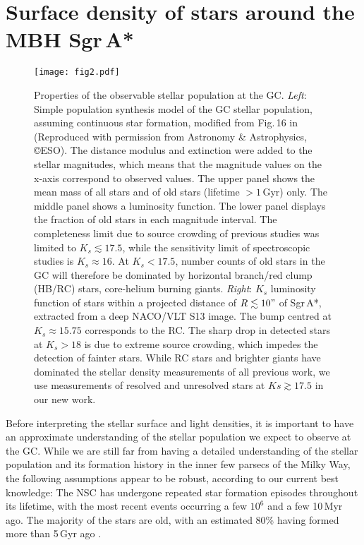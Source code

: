 \documentclass[a4paper]{jpconf}
\begin{document}
\section{Surface density of stars around the MBH Sgr\,A*}


\begin{figure}[htb]
\label{Fig:LF}
\texttt{[image: fig2.pdf]}
\caption{Properties of the observable stellar population at the
  GC. {\it Left}: Simple population synthesis model of the GC stellar
  population, assuming continuous star formation, modified from
  Fig.\,16 in \cite{Schodel:2007tw} (Reproduced with permission from
  Astronomy \& Astrophysics, \copyright ESO). The distance modulus and
  extinction were added to the stellar magnitudes, which means that
  the magnitude values on the x-axis correspond to observed
  values. The upper panel shows the mean mass of all stars and of old
  stars (lifetime $> 1$\,Gyr) only. The middle panel shows a
  luminosity function. The lower panel displays the fraction of old
  stars in each magnitude interval. The completeness limit due to
  source crowding of previous studies was limited to
  $K_{s}\lesssim17.5$, while the sensitivity limit of spectroscopic
  studies is $K_{s}\approx16$. At $K_{s}<17.5$, number counts of old
  stars in the GC will therefore be dominated by horizontal branch/red
  clump (HB/RC) stars, core-helium burning giants. {\it Right}:
  $K_{s}$ luminosity function of stars within a projected distance of
  $R\lesssim10"$ of Sgr\,A*, extracted from a deep NACO/VLT S13 image.
  The bump centred at $K_{s}\approx15.75$ corresponds to the RC. The
  sharp drop in detected stars at $K_{s}>18$ is due to extreme source
  crowding, which impedes the detection of fainter stars. While RC
  stars and brighter giants have dominated the stellar density
  measurements of all previous work, we use measurements of resolved
  and unresolved stars at $Ks\gtrsim17.5$ in our new work.}
\end{figure}
 
Before interpreting the stellar surface and light densities, it is
important to have an approximate understanding of the stellar
population we expect to observe at the GC. While we are still far from
having a detailed understanding of the stellar population and its
formation history in the inner few parsecs of the Milky Way, the
following assumptions appear to be robust, according to our current
best knowledge: The NSC has undergone repeated star formation
episodes throughout its lifetime, with the most recent events
occurring a few $10^{6}$ and a few 10\,Myr ago. The majority of the
stars are old, with an estimated 80\% having formed more than 5\,Gyr
ago \cite{Genzel:2010fk,Pfuhl:2011uq}. 
\end{document}

